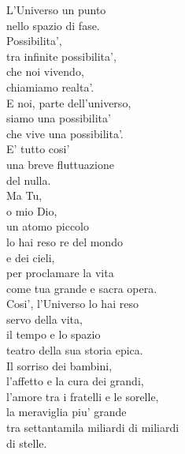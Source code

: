 \begin{haiku}
    L'Universo un punto\\
    nello spazio di fase.\\
    Possibilita',\\
    tra infinite possibilita',\\
    che noi vivendo,\\
    chiamiamo realta'.\\
    E noi, parte dell'universo,\\
    siamo una possibilita'\\
    che vive una possibilita'.\\
    E' tutto cosi' \\
    una breve fluttuazione \\
    del nulla.\\
    Ma Tu,\\
    o mio Dio,\\
    un atomo piccolo\\
    lo hai reso re del mondo\\
    e dei cieli,\\
    per proclamare la vita \\
    come tua grande e sacra opera.\\
    Cosi', l'Universo lo hai reso\\
    servo della vita,\\
    il tempo e lo spazio\\
    teatro della sua storia epica.\\
    Il sorriso dei bambini,\\
    l'affetto e la cura dei grandi,\\
    l'amore tra i fratelli e le sorelle,\\
    la meraviglia piu' grande\\
    tra settantamila miliardi di miliardi\\
    di stelle.\\
\end{haiku}

